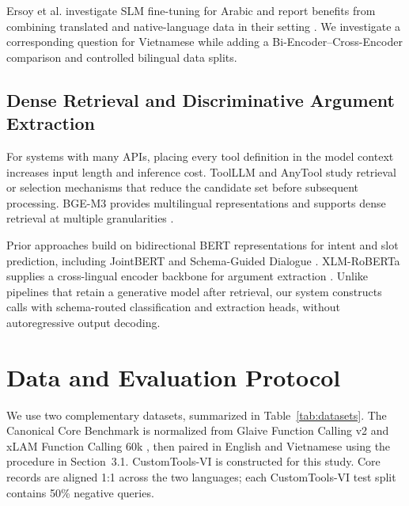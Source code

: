 \documentclass[10pt,twocolumn,a4paper]{article}
\begin{document}
Ersoy et al. investigate SLM fine-tuning for Arabic and report benefits from combining translated and native-language data in their setting \cite{ersoy2025tool}. We investigate a corresponding question for Vietnamese while adding a Bi-Encoder--Cross-Encoder comparison and controlled bilingual data splits.

\subsection{Dense Retrieval and Discriminative Argument Extraction}
For systems with many APIs, placing every tool definition in the model context increases input length and inference cost. ToolLLM \cite{qin2024toolllm} and AnyTool \cite{du2024anytool} study retrieval or selection mechanisms that reduce the candidate set before subsequent processing. BGE-M3 provides multilingual representations and supports dense retrieval at multiple granularities \cite{chen2024bgem3}.

Prior approaches build on bidirectional BERT representations \cite{devlin2019bert} for intent and slot prediction, including JointBERT \cite{chen2019jointbert} and Schema-Guided Dialogue \cite{rastogi2020schema}. XLM-RoBERTa supplies a cross-lingual encoder backbone for argument extraction \cite{conneau2020xlmr}. Unlike pipelines that retain a generative model after retrieval, our system constructs calls with schema-routed classification and extraction heads, without autoregressive output decoding.

\section{Data and Evaluation Protocol}

We use two complementary datasets, summarized in Table~\ref{tab:datasets}. The Canonical Core Benchmark is normalized from Glaive Function Calling v2 \cite{glaive2023dataset} and xLAM Function Calling 60k \cite{xlam2024dataset}, then paired in English and Vietnamese using the procedure in Section~3.1. CustomTools-VI is constructed for this study. Core records are aligned 1:1 across the two languages; each CustomTools-VI test split contains 50\% negative queries.
\end{document}
